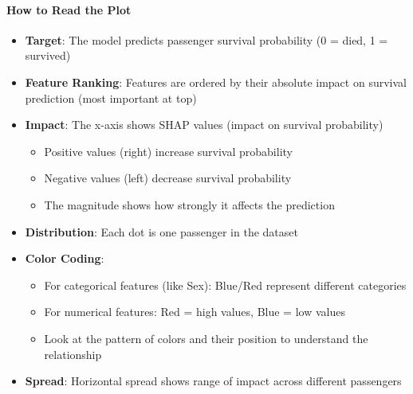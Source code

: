 \documentclass{article}
\begin{document}
\paragraph{How to Read the Plot}
\begin{itemize}
    \item \textbf{Target}: The model predicts passenger survival probability (0 = died, 1 = survived)
    \item \textbf{Feature Ranking}: Features are ordered by their absolute impact on survival prediction (most important at top)
    \item \textbf{Impact}: The x-axis shows SHAP values (impact on survival probability)
        \begin{itemize}
            \item Positive values (right) increase survival probability
            \item Negative values (left) decrease survival probability
            \item The magnitude shows how strongly it affects the prediction
        \end{itemize}
    \item \textbf{Distribution}: Each dot is one passenger in the dataset
    \item \textbf{Color Coding}:
        \begin{itemize}
            \item For categorical features (like Sex): Blue/Red represent different categories
            \item For numerical features: Red = high values, Blue = low values
            \item Look at the pattern of colors and their position to understand the relationship
        \end{itemize}
    \item \textbf{Spread}: Horizontal spread shows range of impact across different passengers
\end{itemize}
\end{document}
